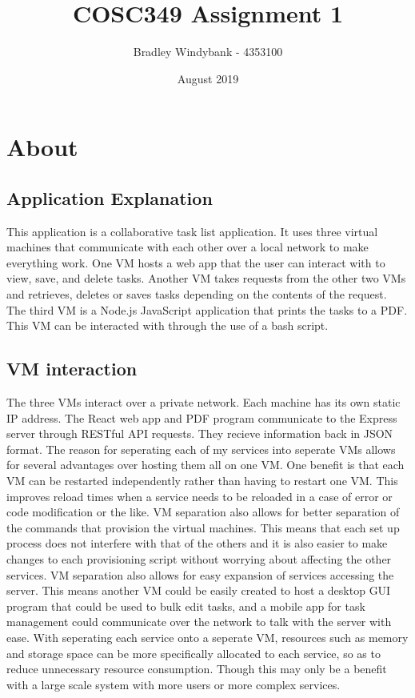 \documentclass[12pt]{extarticle}
\title{COSC349 Assignment 1}
\author{Bradley Windybank - 4353100}
\date{August 2019}
\begin{document}
\maketitle

\section{About}
\subsection{Application Explanation}
This application is a collaborative task list application. It uses three virtual machines that communicate with each other over a local network to make everything work. One VM hosts a web app that the user can interact with to view, save, and delete tasks. Another VM takes requests from the other two VMs and retrieves, deletes or saves tasks depending on the contents of the request. The third VM is a Node.js JavaScript application that prints the tasks to a PDF. This VM can be interacted with through the use of a bash script.

\subsection{VM interaction}
The three VMs interact over a private network. Each machine has its own static IP address. The React web app and PDF program communicate to the Express server through RESTful API requests. They recieve information back in JSON format. The reason for seperating each of my services into seperate VMs allows for several advantages over hosting them all on one VM. One benefit is that each VM can be restarted independently rather than having to restart one VM. This improves reload times when a service needs to be reloaded in a case of error or code modification or the like. VM separation also allows for better separation of the commands that provision the virtual machines. This means that each set up process does not interfere with that of the others and it is also easier to make changes to each provisioning script without worrying about affecting the other services. VM separation also allows for easy expansion of services accessing the server. This means another VM could be easily created to host a desktop GUI program that could be used to bulk edit tasks, and a mobile app for task management could communicate over the network to talk with the server with ease. With seperating each service onto a seperate VM, resources such as memory and storage space can be more specifically allocated to each service, so as to reduce unnecessary resource consumption. Though this may only be a benefit with a large scale system with more users or more complex services.
\end{document}
